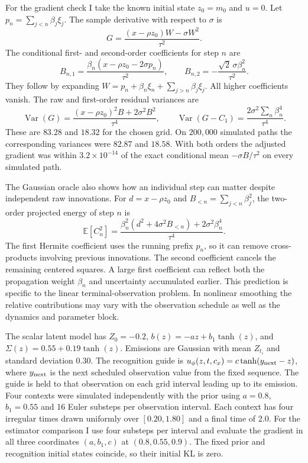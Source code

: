 \documentclass[12pt]{article}
\newcommand{\E}{\mathbb{E}}
\newcommand{\Var}{\operatorname{Var}}
\begin{document}
For the gradient check I take the known initial state \(z_0=m_0\) and \(u=0\). Let \(p_n=\sum_{j<n}\beta_j\xi_j\). The sample derivative with respect to \(\sigma\) is
\[
 G=\frac{(x-\rho z_0)W-\sigma W^2}{\tau^2}.
\]
The conditional first- and second-order coefficients for step \(n\) are
\[
 B_{n,1}=\frac{\beta_n(x-\rho z_0-2\sigma p_n)}{\tau^2},
 \qquad
 B_{n,2}=-\frac{\sqrt{2}\,\sigma\beta_n^2}{\tau^2}.
\]
They follow by expanding \(W=p_n+\beta_n\xi_n+\sum_{j>n}\beta_j\xi_j\). All higher coefficients vanish. The raw and first-order residual variances are
\[
 \Var(G)=\frac{(x-\rho z_0)^2 B+2\sigma^2 B^2}{\tau^4},
 \qquad
 \Var(G-C_1)=\frac{2\sigma^2\sum_n\beta_n^4}{\tau^4}.
\]
These are \(83.28\) and \(18.32\) for the chosen grid. On \(200{,}000\) simulated paths the corresponding variances were \(82.87\) and \(18.58\). With both orders the adjusted gradient was within \(3.2\times 10^{-14}\) of the exact conditional mean \(-\sigma B/\tau^2\) on every simulated path.

The Gaussian oracle also shows how an individual step can matter despite independent raw innovations. For \(d=x-\rho z_0\) and \(B_{<n}=\sum_{j<n}\beta_j^2\), the two-order projected energy of step \(n\) is
\[
 \E[C_n^2]=\frac{\beta_n^2(d^2+4\sigma^2 B_{<n})+2\sigma^2\beta_n^4}{\tau^4}.
\]
The first Hermite coefficient uses the running prefix \(p_n\), so it can remove cross-products involving previous innovations. The second coefficient cancels the remaining centered squares. A large first coefficient can reflect both the propagation weight \(\beta_n\) and uncertainty accumulated earlier. This prediction is specific to the linear terminal-observation problem. In nonlinear smoothing the relative contributions may vary with the observation schedule as well as the dynamics and parameter block.

The scalar latent model has \(Z_0=-0.2\), \(b(z)=-a z+b_1\tanh(z)\), and \(\Sigma(z)=0.55+0.19\tanh(z)\). Emissions are Gaussian with mean \(Z_{t_i}\) and standard deviation \(0.30\). The recognition guide is \(u_\phi(z,t,c_x)=c\tanh(y_{\rm next}-z)\), where \(y_{\rm next}\) is the next scheduled observation value from the fixed sequence. The guide is held to that observation on each grid interval leading up to its emission. Four contexts were simulated independently with the prior using \(a=0.8\), \(b_1=0.55\) and 16 Euler substeps per observation interval. Each context has four irregular times drawn uniformly over \([0.20,1.80]\) and a final time of \(2.0\). For the estimator comparison I use four substeps per interval and evaluate the gradient in all three coordinates \((a,b_1,c)\) at \((0.8,0.55,0.9)\). The fixed prior and recognition initial states coincide, so their initial KL is zero.
\end{document}
